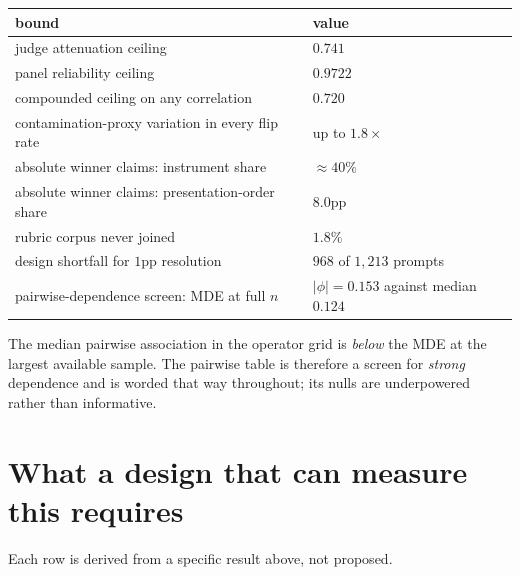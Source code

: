 \begin{table}[H]\centering\small
\begin{tabular}{ll}
\toprule
bound & value\\
\midrule
judge attenuation ceiling & $0.741$\\
panel reliability ceiling & $0.9722$\\
compounded ceiling on any correlation & $0.720$\\
contamination-proxy variation in every flip rate & up to $1.8\times$\\
absolute winner claims: instrument share & $\approx 40\%$\\
absolute winner claims: presentation-order share & $8.0$pp\\
rubric corpus never joined & $1.8\%$\\
design shortfall for $1$pp resolution & $968$ of $1{,}213$ prompts\\
pairwise-dependence screen: MDE at full $n$ & $|\phi| = 0.153$ against median $0.124$\\
\bottomrule
\end{tabular}
\end{table}

\begin{remark}
The median pairwise association in the operator grid is \emph{below} the MDE at
the largest available sample. The pairwise table is therefore a screen for
\emph{strong} dependence and is worded that way throughout; its nulls are
underpowered rather than informative.
\end{remark}

\section{What a design that can measure this requires}
\label{sec:design}

Each row is derived from a specific result above, not proposed.

